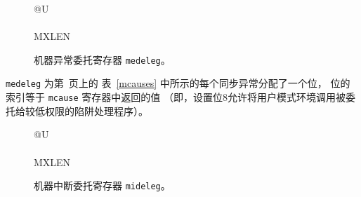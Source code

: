 \begin{figure}[h!]
{\footnotesize
\begin{center}
\begin{tabular}{@{}U}
 \\
\hline
{} \\
\hline
MXLEN \\
\end{tabular}
\end{center}
}
\vspace{-0.1in}
\caption{机器异常委托寄存器 {\tt medeleg}。}
\label{medelegreg}
\end{figure}

\iffalse
{\tt medeleg} has a bit position allocated for every synchronous exception
shown in Table~\ref{mcauses} on page~\pageref{mcauses}, with the index of the bit position equal to the
value returned in the {\tt mcause} register (i.e., setting bit 8 allows
user-mode environment calls to be delegated to a lower-privilege trap
handler).
\fi

{\tt medeleg} 为第~\pageref{mcauses}页上的 表~\ref{mcauses} 中所示的每个同步异常分配了一个位，
位的索引等于 {\tt mcause} 寄存器中返回的值 （即，设置位8允许将用户模式环境调用被委托给较低权限的陷阱处理程序）。


\begin{figure}[h!]
{\footnotesize
\begin{center}
\begin{tabular}{@{}U}
 \\
\hline
{} \\
\hline
MXLEN \\
\end{tabular}
\end{center}
}
\vspace{-0.1in}
\caption{机器中断委托寄存器 {\tt mideleg}。}
\label{midelegreg}
\end{figure}


